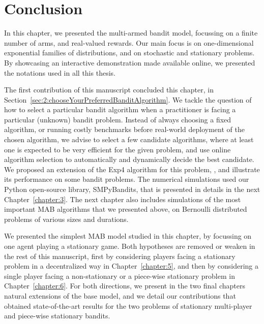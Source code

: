 \section{Conclusion}
\label{sec:2:conclusion}

In this chapter, we presented the multi-armed bandit model, focussing on a finite number of arms, and real-valued rewards.
Our main focus is on one-dimensional exponential families of distributions, and on stochastic and stationary problems.
By showcasing an interactive demonstration made available online,
we presented the notations used in all this thesis.

The first contribution of this manuscript \cite{Besson2018WCNC} concluded this chapter, in Section~\ref{sec:2:chooseYourPreferredBanditAlgorithm}. We tackle the question of how to select a particular bandit algorithm when a practitioner is facing a particular (unknown) bandit problem.
Instead of always choosing a fixed algorithm, or running costly benchmarks before real-world deployment of the chosen algorithm, we advise to select a few candidate algorithms, where at least one is expected to be very efficient for the given problem, and use online algorithm selection to automatically and dynamically decide the best candidate.
We proposed an extension of the Exp4 algorithm for this problem, \Aggr, and illustrate its performance on some bandit problems.
%
The numerical simulations used our Python open-source library, SMPyBandits, that is presented in details in the next Chapter~\ref{chapter:3}.
The next chapter also includes simulations of the most important MAB algorithms that we presented above, on Bernoulli distributed problems of various sizes and durations.

We presented the simplest MAB model studied in this chapter, by focussing on one agent playing a stationary game.
Both hypotheses are removed or weaken in the rest of this manuscript,
first by considering players facing a stationary problem in a decentralized way in Chapter~\ref{chapter:5},
and then by considering a single player facing a non-stationary or a piece-wise stationary problem in Chapter~\ref{chapter:6}.
%
For both directions, we present in the two final chapters natural extensions of the base model, and we detail our contributions that obtained state-of-the-art results for the two problems
of stationary multi-player and piece-wise stationary bandits.

